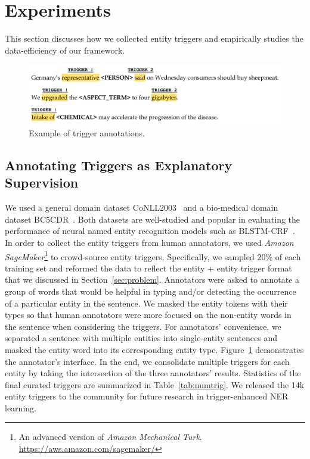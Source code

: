 \newpage %

\section{Experiments}
\label{sec:exp}
This section discusses how we collected entity triggers and empirically studies the data-efficiency of our framework.

\begin{figure}[h] %
	\centering
	\includegraphics[width=0.9\linewidth]{LatexDiss/figures/triggers.pdf}
	\caption{Example of trigger annotations.}
	\label{fig:triggerannotation}
\end{figure}

\subsection{Annotating Triggers as Explanatory Supervision}
\label{sec:trigger}

We used a general domain dataset CoNLL2003~\citep{conll} and a bio-medical domain dataset BC5CDR~\citep{bc5cdr}.
Both datasets are well-studied and popular in evaluating the performance of neural named entity recognition models such as BLSTM-CRF~\citep{DBLP:conf/acl/MaH16}.
In order to collect the entity triggers from human annotators, 
we used \textit{Amazon SageMaker}\footnote{An advanced version of \textit{Amazon Mechanical Turk}. \url{https://aws.amazon.com/sagemaker/}} to crowd-source entity triggers.
Specifically, we sampled 20\% of each training set and reformed the data to reflect the entity $+$ entity trigger format that we discussed in Section~\ref{sec:problem}.
Annotators were asked to annotate a group of words that would be helpful in typing and/or detecting the occurrence of a particular entity in the sentence.
We masked the entity tokens with their types so that human annotators were more focused on the non-entity words in the sentence when considering the triggers.
For annotators' convenience, we separated a sentence with multiple entities into single-entity sentences and masked the entity word into its corresponding entity type. Figure~\ref{fig:triggerannotation} demonstrates the annotator's interface.
In the end, we consolidate multiple triggers for each entity by taking the intersection of the three annotators' results. 
Statistics of the final curated triggers are summarized in Table~\ref{tab:numtrig}.
We released the 14k entity triggers to the community for future research in trigger-enhanced NER learning. %


